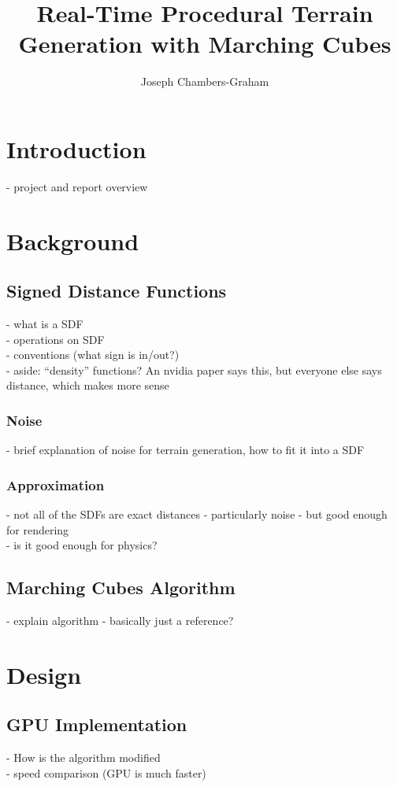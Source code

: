 \documentclass{article}
\title{Real-Time Procedural Terrain Generation with Marching Cubes}
\author{Joseph Chambers-Graham}
\date{}
\begin{document}
\maketitle
\newpage

\tableofcontents
\section{Introduction}
- project and report overview
\section{Background}
\subsection{Signed Distance Functions}
- what is a SDF\\
- operations on SDF\\
- conventions (what sign is in/out?)\\
- aside: ``density'' functions? An nvidia paper says this, but everyone else says distance, which makes more sense\\

\subsubsection{Noise}
- brief explanation of noise for terrain generation, how to fit it into a SDF
\subsubsection{Approximation}
- not all of the SDFs are exact distances - particularly noise - but good enough for rendering\\
- is it good enough for physics?
\subsection{Marching Cubes Algorithm}
- explain algorithm - basically just a reference?

\section{Design}
\subsection{GPU Implementation}
- How is the algorithm modified\\
- speed comparison (GPU is much faster)
\end{document}
